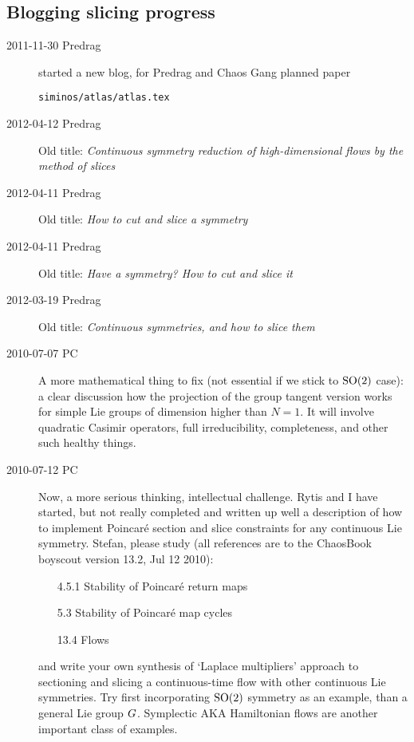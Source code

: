 \subsection{Blogging slicing progress}
\label{chap:atlasBlog}

\begin{description}
\item[2011-11-30 Predrag]
started a new blog, for Predrag and Chaos Gang planned paper

\texttt{siminos/atlas/atlas.tex}

\item[2012-04-12 Predrag] Old title: {\em
Continuous symmetry reduction of high-dimensional flows  by the method of
slices}
\item[2012-04-11 Predrag] Old title: {\em
How to cut and slice a symmetry}
\item[2012-04-11 Predrag] Old title: {\em
Have a symmetry? How to cut and slice it}
\item[2012-03-19 Predrag] Old title: {\em
Continuous symmetries, and how to slice them}


\item[2010-07-07 PC]                                    \toCB
A more mathematical thing to fix (not essential if we stick to $\textrm{SO}(2)$
case): a clear discussion how the projection of the group tangent version
works for simple Lie groups of dimension higher than $N=1$. It will
involve quadratic Casimir operators, full irreducibility, completeness,
and other such healthy things.

\item[2010-07-12 PC] Now, a more serious thinking, intellectual
challenge. Rytis and I have started, but not really completed and written
up well a description of how to implement Poincar\'e section and slice
constraints for any continuous Lie symmetry. Stefan, please study (all
references are to the ChaosBook boyscout version 13.2, Jul 12 2010):
\begin{itemize}
  \item[4.5.1] Stability of Poincar\'e return maps
  \item[5.3] Stability of Poincar\'e map cycles
  \item[13.4] Flows
\end{itemize}
and write your own synthesis of `Laplace multipliers' approach to
sectioning and slicing a continuous-time flow with other continuous Lie
symmetries. Try first incorporating $\textrm{SO}(2)$ symmetry as an example, than
a general Lie group $G$. Symplectic AKA Hamiltonian flows are
another important class of examples.


\end{description}
